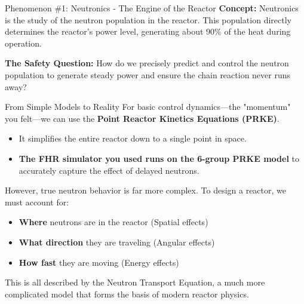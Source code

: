 \documentclass[aspectratio=169]{beamer}
\begin{document}
\begin{frame}[allowframebreaks]{Phenomenon \#1: Neutronics - The Engine of the Reactor}
    \textbf{Concept:} Neutronics is the study of the neutron population in the reactor. This population directly determines the reactor's power level, generating about 90\% of the heat during operation.

    \vspace{1em}
    \textbf{The Safety Question:} How do we precisely predict and control the neutron population to generate steady power and ensure the chain reaction never runs away?

    \vspace{1.5em}
    \begin{exampleblock}{From Simple Models to Reality}
        For basic control dynamics—the "momentum" you felt—we can use the \textbf{Point Reactor Kinetics Equations (PRKE)}.
        \begin{itemize}
            \item It simplifies the entire reactor down to a single point in space.
            \item \textbf{The FHR simulator you used runs on the 6-group PRKE model} to accurately capture the effect of delayed neutrons.
        \end{itemize}
        \vspace{1em}
        However, true neutron behavior is far more complex. To design a reactor, we must account for:
        \begin{itemize}
            \item \textbf{Where} neutrons are in the reactor (Spatial effects)
            \item \textbf{What direction} they are traveling (Angular effects)
            \item \textbf{How fast} they are moving (Energy effects)
        \end{itemize}
        This is all described by the Neutron Transport Equation, a much more complicated model that forms the basis of modern reactor physics.
    \end{exampleblock}
\end{frame}
\end{document}
